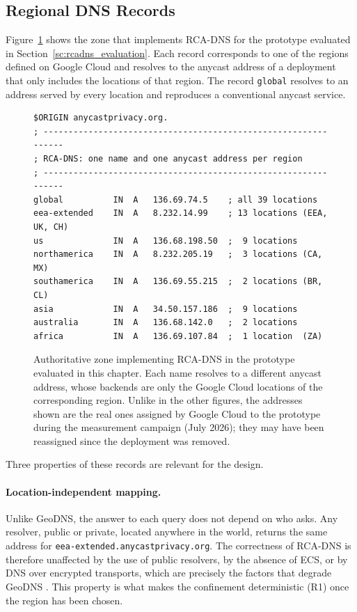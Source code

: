 \subsection{Regional DNS Records}
\label{sc:rcadns_records}

Figure~\ref{fig:rcadns_zone} shows the zone that implements RCA-DNS for the prototype evaluated in Section~\ref{sc:rcadns_evaluation}. Each record corresponds to one of the regions defined on Google Cloud and resolves to the anycast address of a deployment that only includes the locations of that region. The record \texttt{global} resolves to an address served by every location and reproduces a conventional anycast service.

\begin{figure}[ht]
    \centering
\begin{Verbatim}[fontsize=\footnotesize, frame=single, framesep=3mm, rulecolor=\color{black!55}]
$ORIGIN anycastprivacy.org.
; ---------------------------------------------------------------
; RCA-DNS: one name and one anycast address per region
; ---------------------------------------------------------------
global          IN  A   136.69.74.5    ; all 39 locations
eea-extended    IN  A   8.232.14.99    ; 13 locations (EEA, UK, CH)
us              IN  A   136.68.198.50  ;  9 locations
northamerica    IN  A   8.232.205.19   ;  3 locations (CA, MX)
southamerica    IN  A   136.69.55.215  ;  2 locations (BR, CL)
asia            IN  A   34.50.157.186  ;  9 locations
australia       IN  A   136.68.142.0   ;  2 locations
africa          IN  A   136.69.107.84  ;  1 location  (ZA)
\end{Verbatim}
    \caption{Authoritative zone implementing RCA-DNS in the prototype evaluated in this chapter. Each name resolves to a different anycast address, whose backends are only the Google Cloud locations of the corresponding region. Unlike in the other figures, the addresses shown are the real ones assigned by Google Cloud to the prototype during the measurement campaign (July 2026); they may have been reassigned since the deployment was removed.}
    \label{fig:rcadns_zone}
\end{figure}

Three properties of these records are relevant for the design.

\paragraph{Location-independent mapping.} Unlike GeoDNS, the answer to each query does not depend on who asks. Any resolver, public or private, located anywhere in the world, returns the same address for \texttt{eea-extended.anycastprivacy.org}. The correctness of RCA-DNS is therefore unaffected by the use of public resolvers, by the absence of ECS, or by DNS over encrypted transports, which are precisely the factors that degrade GeoDNS \cite{Otto2012ContentSolutions, Contavalli2016ClientQueries}. This property is what makes the confinement deterministic (R1) once the region has been chosen.

